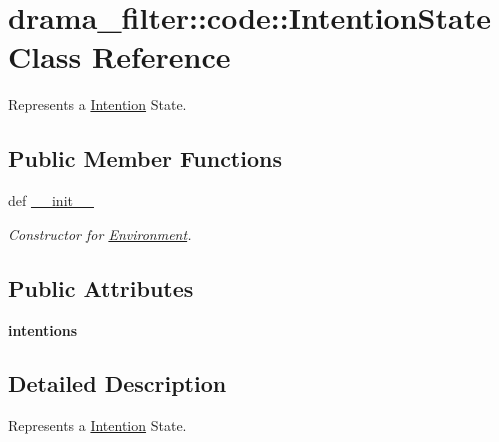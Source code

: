 \hypertarget{classdrama__filter_1_1code_1_1IntentionState}{
\section{drama\_\-filter::code::IntentionState Class Reference}
\label{classdrama__filter_1_1code_1_1IntentionState}
}


Represents a \hyperlink{classdrama__filter_1_1code_1_1Intention}{Intention} State.  


\subsection*{Public Member Functions}
\begin{DoxyCompactItemize}
\item 
def \hyperlink{classdrama__filter_1_1code_1_1IntentionState_a3555e053483cb6bab4d648b59c2f86c1}{\_\-\_\-init\_\-\_\-}
\begin{DoxyCompactList}\small\item\em Constructor for \hyperlink{classdrama__filter_1_1code_1_1Environment}{Environment}. \end{DoxyCompactList}\end{DoxyCompactItemize}
\subsection*{Public Attributes}
\begin{DoxyCompactItemize}
\item 
\hypertarget{classdrama__filter_1_1code_1_1IntentionState_ad73012ef05340c37946e123e170b1c18}{
{\bfseries intentions}}
\label{classdrama__filter_1_1code_1_1IntentionState_ad73012ef05340c37946e123e170b1c18}

\end{DoxyCompactItemize}


\subsection{Detailed Description}
Represents a \hyperlink{classdrama__filter_1_1code_1_1Intention}{Intention} State. 

